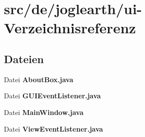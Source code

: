 \section{src/de/joglearth/ui-\/\-Verzeichnisreferenz}
\label{dir_4b274c199fc58ae06d55f08d9b9a949d}
\subsection*{Dateien}
\begin{DoxyCompactItemize}
\item 
Datei {\bfseries About\-Box.\-java}
\item 
Datei {\bfseries G\-U\-I\-Event\-Listener.\-java}
\item 
Datei {\bfseries Main\-Window.\-java}
\item 
Datei {\bfseries View\-Event\-Listener.\-java}
\end{DoxyCompactItemize}
